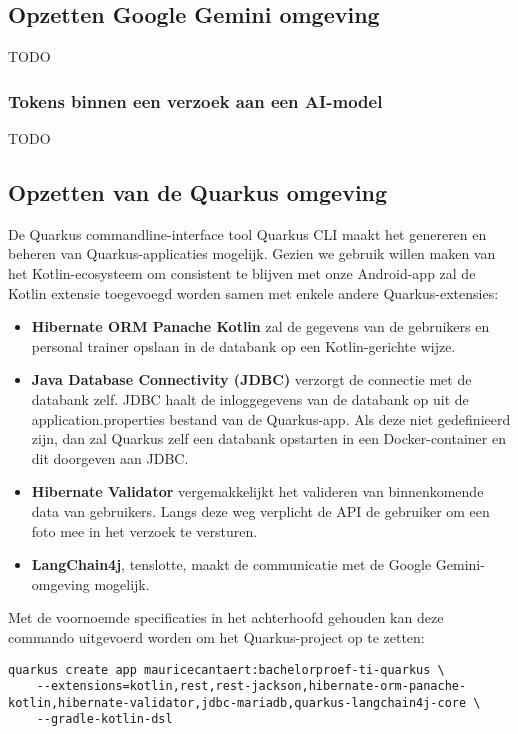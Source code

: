\subsection{Opzetten Google Gemini omgeving}
\label{subsec:opzetten-google-gemini-omgeving}
TODO

\subsubsection{Tokens binnen een verzoek aan een AI-model}
TODO %

\subsection{Opzetten van de Quarkus omgeving}
\label{subsec:opzetten-quarkus-omgeving}
De Quarkus commandline-interface tool Quarkus CLI maakt het genereren en beheren van Quarkus-applicaties mogelijk.
Gezien we gebruik willen maken van het Kotlin-ecosysteem om consistent te blijven met onze Android-app zal de Kotlin extensie toegevoegd worden samen met enkele andere Quarkus-extensies:
\begin{itemize}
    \item \textbf{Hibernate ORM Panache Kotlin} zal de gegevens van de gebruikers en personal trainer opslaan in de databank op een Kotlin-gerichte wijze.
    \item \textbf{Java Database Connectivity (JDBC)} verzorgt de connectie met de databank zelf.
    JDBC haalt de inloggegevens van de databank op uit de application.properties bestand van de Quarkus-app.
    Als deze niet gedefinieerd zijn, dan zal Quarkus zelf een databank opstarten in een Docker-container en dit doorgeven aan JDBC\@.
    \item \textbf{Hibernate Validator} vergemakkelijkt het valideren van binnenkomende data van gebruikers.
    Langs deze weg verplicht de API de gebruiker om een foto mee in het verzoek te versturen.
    \item \textbf{LangChain4j}, tenslotte, maakt de communicatie met de Google Gemini-omgeving mogelijk.
\end{itemize}
Met de voornoemde specificaties in het achterhoofd gehouden kan deze commando uitgevoerd worden om het Quarkus-project op te zetten:
\begin{mdframed}[backgroundcolor=bg]
    \begin{verbatim}
quarkus create app mauricecantaert:bachelorproef-ti-quarkus \
    --extensions=kotlin,rest,rest-jackson,hibernate-orm-panache-kotlin,hibernate-validator,jdbc-mariadb,quarkus-langchain4j-core \
    --gradle-kotlin-dsl
    \end{verbatim}
\end{mdframed}

